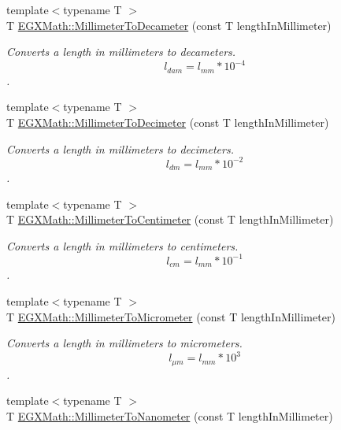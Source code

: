 \begin{DoxyCompactItemize}
{\footnotesize template$<$typename T $>$ }\\T \mbox{\hyperlink{group___e_g_x_math-_conversions-_length_conversions-_s_i-_millimeter-_s_i_gaf0e54830f6ae997dde95341e87638bf5}{E\+G\+X\+Math\+::\+Millimeter\+To\+Decameter}} (const T length\+In\+Millimeter)
\begin{DoxyCompactList}\small\item\em Converts a length in millimeters to decameters. \[ l_{dam}=l_{mm} * 10^{-4} \]. \end{DoxyCompactList}\item 
{\footnotesize template$<$typename T $>$ }\\T \mbox{\hyperlink{group___e_g_x_math-_conversions-_length_conversions-_s_i-_millimeter-_s_i_gad38e2be59f56a27e7628cfcbaa4a7df2}{E\+G\+X\+Math\+::\+Millimeter\+To\+Decimeter}} (const T length\+In\+Millimeter)
\begin{DoxyCompactList}\small\item\em Converts a length in millimeters to decimeters. \[ l_{dm}=l_{mm} * 10^{-2} \]. \end{DoxyCompactList}\item 
{\footnotesize template$<$typename T $>$ }\\T \mbox{\hyperlink{group___e_g_x_math-_conversions-_length_conversions-_s_i-_millimeter-_s_i_gaa77c48215c6c4f46394025af4cb26ead}{E\+G\+X\+Math\+::\+Millimeter\+To\+Centimeter}} (const T length\+In\+Millimeter)
\begin{DoxyCompactList}\small\item\em Converts a length in millimeters to centimeters. \[ l_{cm}=l_{mm} * 10^{-1} \]. \end{DoxyCompactList}\item 
{\footnotesize template$<$typename T $>$ }\\T \mbox{\hyperlink{group___e_g_x_math-_conversions-_length_conversions-_s_i-_millimeter-_s_i_gadec5d89ecdd6bfe638f54ceffe0e0630}{E\+G\+X\+Math\+::\+Millimeter\+To\+Micrometer}} (const T length\+In\+Millimeter)
\begin{DoxyCompactList}\small\item\em Converts a length in millimeters to micrometers. \[ l_{\mu m}=l_{mm} * 10^{3} \]. \end{DoxyCompactList}\item 
{\footnotesize template$<$typename T $>$ }\\T \mbox{\hyperlink{group___e_g_x_math-_conversions-_length_conversions-_s_i-_millimeter-_s_i_ga4ed79a00a348e87b09e55e34d852841c}{E\+G\+X\+Math\+::\+Millimeter\+To\+Nanometer}} (const T length\+In\+Millimeter)

\end{DoxyCompactItemize}
